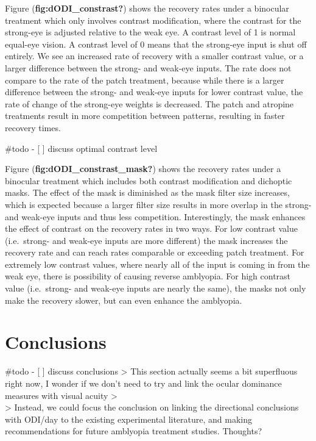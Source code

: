 \documentclass[
  letterpaper,
]{book}
\begin{document}
Figure (\textbf{fig:dODI\_constrast?}) shows the recovery rates under a
binocular treatment which only involves contrast modification, where the
contrast for the strong-eye is adjusted relative to the weak eye. A
contrast level of 1 is normal equal-eye vision. A contrast level of 0
means that the strong-eye input is shut off entirely. We see an
increased rate of recovery with a smaller contrast value, or a larger
difference between the strong- and weak-eye inputs. The rate does not
compare to the rate of the patch treatment, because while there is a
larger difference between the strong- and weak-eye inputs for lower
contrast value, the rate of change of the strong-eye weights is
decreased. The patch and atropine treatments result in more competition
between patterns, resulting in faster recovery times.

\#todo - {[} {]} discuss optimal contrast level

Figure (\textbf{fig:dODI\_constrast\_mask?}) shows the recovery rates
under a binocular treatment which includes both contrast modification
and dichoptic masks. The effect of the mask is diminished as the mask
filter size increases, which is expected because a larger filter size
results in more overlap in the strong- and weak-eye inputs and thus less
competition. Interestingly, the mask enhances the effect of contrast on
the recovery rates in two ways. For low contrast value (i.e.~strong- and
weak-eye inputs are more different) the mask increases the recovery rate
and can reach rates comparable or exceeding patch treatment. For
extremely low contrast values, where nearly all of the input is coming
in from the weak eye, there is possibility of causing reverse amblyopia.
For high contrast value (i.e.~strong- and weak-eye inputs are nearly the
same), the masks not only make the recovery slower, but can even enhance
the amblyopia.

\part{Conclusions}

\#todo - {[} {]} discuss conclusions \textgreater{} This section
actually seems a bit superfluous right now, I wonder if we don't need to
try and link the ocular dominance measures with visual acuity
\textgreater{}\\
\textgreater{} Instead, we could focus the conclusion on linking the
directional conclusions with ODI/day to the existing experimental
literature, and making recommendations for future amblyopia treatment
studies. Thoughts?
\end{document}
